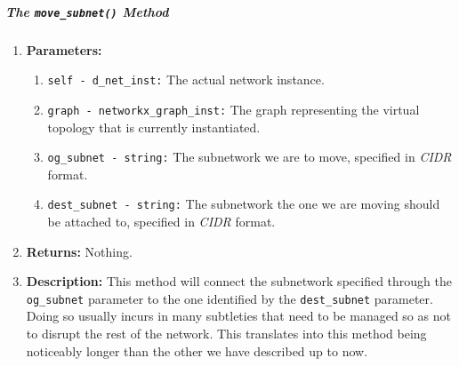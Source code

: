     \subparagraph{The \texttt{move\_subnet()} Method}
        \begin{enumerate}
            \item \textbf{Parameters:}
            \begin{enumerate}
                \item \texttt{self - d\_net\_inst:} The actual network instance.
                \item \texttt{graph - networkx\_graph\_inst:} The graph representing the virtual topology that is currently instantiated.
                \item \texttt{og\_subnet - string:} The subnetwork we are to move, specified in \textit{CIDR} format.
                \item \texttt{dest\_subnet - string:} The subnetwork the one we are moving should be attached to, specified in \textit{CIDR} format.
            \end{enumerate}
            \item \textbf{Returns:} Nothing.
            \item \textbf{Description:} This method will connect the subnetwork specified through the \texttt{og\_subnet} parameter to the one identified by the \texttt{dest\_subnet} parameter. Doing so usually incurs in many subtleties that need to be managed so as not to disrupt the rest of the network. This translates into this method being noticeably longer than the other we have described up to now.
        \end{enumerate}

